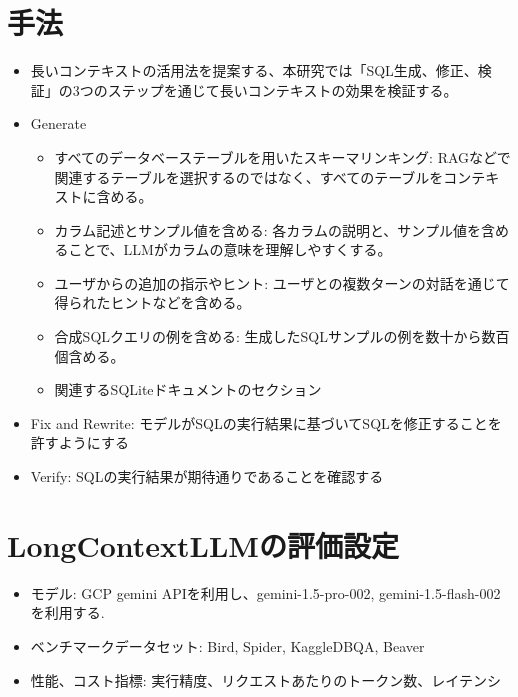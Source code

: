 \documentclass[dvipdfmx,uplatex]{jsarticle}
\theoremstyle{remark}
\newenvironment{method}[1]{
    \begin{tcolorbox}[
        colframe=green!50!black,
        colback=green!50!black!10!white,
        colbacktitle=green!50!black!40!white,
        coltitle=black,
        fonttitle=\bfseries,
        title={#1}
    ]
}{
    \end{tcolorbox}
}
\newenvironment{experiment}[1]{
    \begin{tcolorbox}[
        colframe=violet,
        colback=violet!10!white,
        colbacktitle=violet!40!white,
        coltitle=black,
        fonttitle=\bfseries,
        title={#1}
    ]
}{
    \end{tcolorbox}
}
\begin{document}
\section{手法}
\begin{method}{Long Context Prompting}
\begin{itemize}
    \item 長いコンテキストの活用法を提案する、本研究では「SQL生成、修正、検証」の3つのステップを通じて長いコンテキストの効果を検証する。
    \item Generate
    \begin{itemize}
        \item すべてのデータベーステーブルを用いたスキーマリンキング: RAGなどで関連するテーブルを選択するのではなく、すべてのテーブルをコンテキストに含める。
        \item  カラム記述とサンプル値を含める: 各カラムの説明と、サンプル値を含めることで、LLMがカラムの意味を理解しやすくする。
        \item ユーザからの追加の指示やヒント: ユーザとの複数ターンの対話を通じて得られたヒントなどを含める。
        \item 合成SQLクエリの例を含める: 生成したSQLサンプルの例を数十から数百個含める。
        \item 関連するSQLiteドキュメントのセクション
    \end{itemize}
    \item Fix and Rewrite: モデルがSQLの実行結果に基づいてSQLを修正することを許すようにする
    \item Verify: SQLの実行結果が期待通りであることを確認する   
\end{itemize}
\end{method}

\section{LongContextLLMの評価設定}
\begin{experiment}{評価設定}
\begin{itemize}
    \item モデル: GCP gemini APIを利用し、gemini-1.5-pro-002, gemini-1.5-flash-002 を利用する.
    \item ベンチマークデータセット: Bird, Spider, KaggleDBQA, Beaver
    \item 性能、コスト指標: 実行精度、リクエストあたりのトークン数、レイテンシ
\end{itemize}
\end{experiment}
\end{document}
